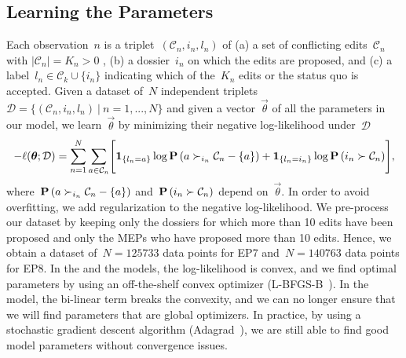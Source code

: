 \subsection{Learning the Parameters}
\label{lmp:sec:training}

Each observation~$n$ is a triplet~$( \mathcal{C}_n, i_n, l_n )$ of (a) a set of conflicting edits~$\mathcal{C}_n$ with $| \mathcal{C}_n | = K_n > 0$ , (b) a dossier~$i_n$ on which the edits are proposed, and (c) a label~$l_n \in \mathcal{C}_k \cup \{ i_n \}$ indicating which of the~$K_n$ edits or the status quo is accepted.
Given a dataset of~$N$ independent triplets \mbox{$\mathcal{D} = \{ ( \mathcal{C}_n, i_n, l_n )~\vert~n = 1, ..., N \}$} and given a vector~$\vec{\theta}$ of all the parameters in our model, we learn~$\vec{\theta}$ by minimizing their negative log-likelihood under~$\mathcal{D}$
\begin{equation*}
	- \ell(\boldsymbol{\theta} ; \mathcal{D})
	= \sum_{n = 1}^N  \sum_{a \in \mathcal{C}_n} \Biggl[ \bm{1}_{\left \{ l_n = a \right \} } \log \mathbf{P}\left( a \succ_{i_n} \mathcal{C}_n - \{ a \}  \right)
		+ \bm{1}_{\left \{ l_n = i_n \right \} } \log \mathbf{P}\left( i_n \succ \mathcal{C}_n  \right) \Biggr],
\end{equation*}
where~$\mathbf{P}\left( a \succ_{i_n} \mathcal{C}_n - \{ a \}  \right)$ and~$\mathbf{P}\left( i_n \succ \mathcal{C}_n  \right)$ depend on~$\vec{\theta}$.
In order to avoid overfitting, we add regularization to the negative log-likelihood.
We pre-process our dataset by keeping only the dossiers for which more than 10 edits have been proposed and only the MEPs who have proposed more than 10 edits.
Hence, we obtain a dataset of~$N=125733$ data points for EP7 and~$N=140763$ data points for EP8.
In the  and the  models, the log-likelihood is convex, and we find optimal parameters by using an off-the-shelf convex optimizer (L-BFGS-B~\cite{byrd1995limited}).
In the  model, the bi-linear term breaks the convexity, and we can no longer ensure that we will find parameters that are global optimizers.
In practice, by using a stochastic gradient descent algorithm (Adagrad~\cite{duchi2011adaptive}), we are still able to find good model parameters without convergence issues.

